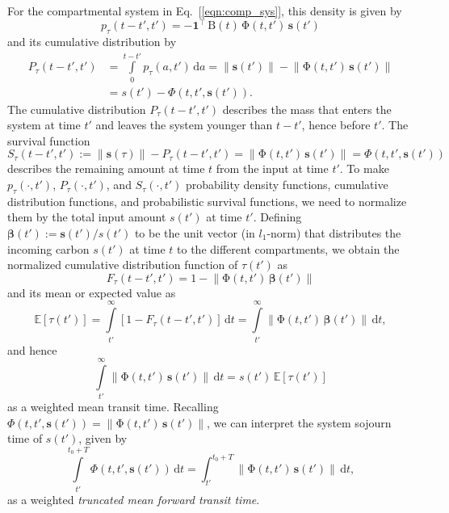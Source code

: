 \documentclass[ProofPDF]{./Styles/Jnls-Template-V3}
\newcommand{\intl}{\int\limits}
\newcommand{\dd}[1]{\,\mathrm{d}#1}
\renewcommand{\vec}[1]{\mathbf{#1}}
\newcommand{\tens}[1]{\mathrm{#1}}
\newcommand{\itPhi}{\mathit{\Phi}}
\newcommand{\noEqref}[1]{[\ref{#1}]}
\newcommand{\vnorm}[1]{\left\|#1\right\|}
\begin{document}
For the compartmental system in Eq.~\noEqref{eqn:comp_sys}, this density is given by
\begin{equation}
    p_\tau(t-t', t') = -\vec{1}^{\top}\,\tens{B}(t)\,\tens{\Phi}(t, t')\,\vec{s}(t')
\end{equation}
and its cumulative distribution by
\begin{equation}
    \begin{aligned}
        P_\tau(t-t',t') &= \intl_0^{t-t'} p_\tau(a, t')\dd{a} = \vnorm{\vec{s}(t')} - \vnorm{\tens{\Phi}(t,t')\,\vec{s}(t')} \\
        &= s(t') - \itPhi(t,t',\vec{s}(t')).
    \end{aligned}
\end{equation}
The cumulative distribution $P_\tau(t-t',t')$ describes the mass that enters the system at time $t'$ and leaves the system younger than $t-t'$, hence before $t'$.
The survival function
\begin{equation}
    S_\tau(t-t',t'):=\vnorm{\vec{s}(\tau)} - P_\tau(t-t',t') = \vnorm{\tens{\Phi}(t,t')\,\vec{s}(t')} = \itPhi(t,t',\vec{s}(t'))
\end{equation}
describes the remaining amount at time $t$ from the input at time $t'$.
To make $p_\tau(\cdot,t')$, $P_\tau(\cdot,t')$, and $S_\tau(\cdot,t')$ probability density functions, cumulative distribution functions, and probabilistic survival functions, we need to normalize them by the total input amount $s(t')$ at time $t'$.
Defining $\vec{\beta}(t'):=\vec{s}(t')/s(t')$ to be the unit vector (in $l_1$-norm) that distributes the incoming carbon $s(t')$ at time $t$ to the different compartments, we obtain the normalized cumulative distribution function of $\tau(t')$ as
\begin{equation}
    F_\tau(t-t',t') = 1 - \vnorm{\tens{\Phi}(t,t')\,\vec{\beta}(t')}
\end{equation}
and its mean or expected value as
\begin{equation}
    \mathbb{E}\left[\tau(t')\right] = \intl_{t'}^\infty \left[1-F_\tau(t-t',t')\right]\dd{t} = \intl_{t'}^\infty \vnorm{\tens{\Phi}(t,t')\,\vec{\beta}(t')}\dd{t},
\end{equation}
and hence
\begin{equation}
    \intl_{t'}^\infty \vnorm{\tens{\Phi}(t,t')\,\vec{s}(t')}\dd{t} = s(t')\,\mathbb{E}\left[\tau(t')\right]
\end{equation}
as a weighted mean transit time.
Recalling $\itPhi(t,t',\vec{s}(t'))=\vnorm{\tens{\Phi}(t,t')\,\vec{s}(t')}$, we can interpret the system sojourn time of
$s(t')$, given by
\begin{equation}
    \intl_{t'}^{t_0+T} \itPhi(t,t',\vec{s}(t'))\dd{t} = \int_{t'}^{t_0+T} \vnorm{\tens{\Phi}(t,t')\,\vec{s}(t')}\dd{t},
\end{equation}
as a weighted {\it truncated mean forward transit time}.
\end{document}
